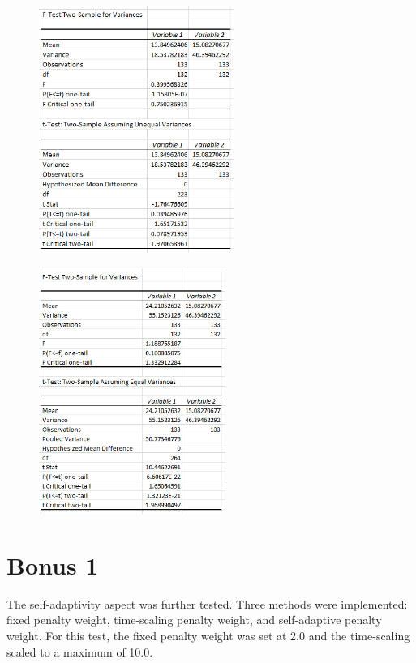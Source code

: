 \documentclass[11pt]{article}
\begin{document}
\begin{figure}[h]
\centering
\begin{minipage}{.5\textwidth}
\centering
  \includegraphics[width=2.5in]{assn1c_stat_anal_crossovers_set1.png}
  \label{fig:statanal1}
\end{minipage}%
\begin{minipage}{.5\textwidth}
\centering
  \includegraphics[width=2.4in]{assn1c_stat_anal_penalty_weight_1_set1.png}
  \label{fig:statanal2}
\end{minipage}
\end{figure}


\section{Bonus 1}\label{sect:bonus1}

The self-adaptivity aspect was further tested. Three methods were implemented: fixed penalty weight, time-scaling penalty weight, and self-adaptive penalty weight. For this test, the fixed penalty weight was set at 2.0 and the time-scaling scaled to a maximum of 10.0.
\end{document}
